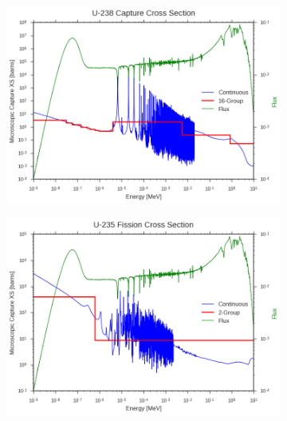 \begin{figure}
\begin{subfigure}{.5\textwidth}
  \caption{}
\end{subfigure}
\begin{subfigure}{.5\textwidth}
  \centering
  \includegraphics[width=\linewidth]{figures/intro/u238-capture-16}
  \caption{}
\end{subfigure}
\begin{subfigure}{.5\textwidth}
  \centering
  \includegraphics[width=\linewidth]{figures/intro/u235-fission-2}
  \caption{}
\end{subfigure}
\begin{subfigure}{.5\textwidth}
  \centering

\end{subfigure}
\end{figure}
